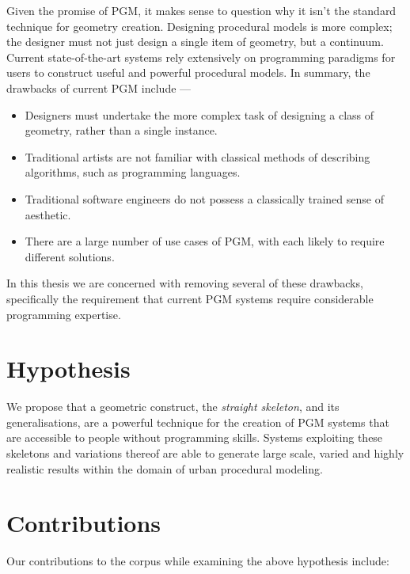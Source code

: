 
Given the promise of PGM, it makes sense to question why it isn't the standard technique for geometry creation. Designing procedural models is more complex; the designer must not just design a single item of geometry, but a continuum. Current state-of-the-art systems rely extensively on programming paradigms for users to construct useful and powerful procedural models. In summary, the drawbacks of current PGM include ---

\begin{itemize}
\item{Designers must undertake the more complex task of designing a class of geometry, rather than a single instance.}
\item{Traditional artists are not familiar with classical methods of describing algorithms, such as programming languages.}
\item{Traditional software engineers do not possess a classically trained sense of aesthetic.}
\item{There are a large number of use cases of PGM, with each likely to require different solutions. 
} 
\end{itemize}

In this thesis we are concerned with removing several of these drawbacks, specifically the requirement that current PGM systems require considerable programming expertise.

\section{Hypothesis}
\label{c:intro:thesisstatement}

We propose that a geometric construct, the \emph{straight skeleton}, and its generalisations, are a powerful technique for the creation of PGM systems that are accessible to people without programming skills.  Systems exploiting these skeletons and variations thereof are able to generate large scale, varied and highly realistic results within the domain of urban procedural modeling.

\section{Contributions}

Our contributions to the corpus while examining the above hypothesis include:

